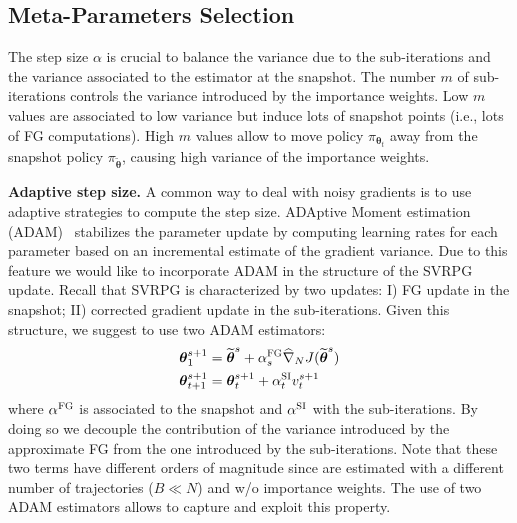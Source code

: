 \documentclass{article}
\makeatletter
\theoremstyle{remark}
\theoremstyle{definition}
\DeclareRobustCommand{\ie}{i.e.,\@\xspace}
\newcommand{\todopir}[1]{\todo[color=blued, inline]{\small #1}}
\newcommand{\vtheta}{\boldsymbol{\theta}}
\newcommand{\wt}[1]{\widetilde{#1}}
\newcommand{\wh}[1]{\widehat{#1}}
\makeatother
\begin{document}
\subsection{Meta-Parameters Selection}\label{sec:stopping}
\todopir{I'm here!}
The step size $\alpha$ is crucial to balance the variance due to the sub-iterations and the variance associated to the estimator at the snapshot.
The number $m$ of sub-iterations controls the variance introduced by the importance weights. Low $m$ values are associated to low variance but induce lots of snapshot points (\ie lots of FG computations). High $m$ values allow to move policy $\pi_{\vtheta_t}$ away from the snapshot policy $\pi_{\wt{\vtheta}}$, causing high variance of the importance weights.

\textbf{Adaptive step size.}
A common way to deal with noisy gradients is to use adaptive strategies to compute the step size.
ADAptive Moment estimation (ADAM)~\citep{kingma2014adam} stabilizes the parameter update by computing learning rates for each parameter based on an incremental estimate of the gradient variance.
Due to this feature we would like to incorporate ADAM in the structure of the SVRPG update.
Recall that SVRPG is characterized by two updates: I) FG update in the snapshot; II) corrected gradient update in the sub-iterations.
Given this structure, we suggest to use two ADAM estimators:
\begin{align*}
        \vtheta^{s+1}_1 &= \wt{\vtheta}^s + \alpha^{\textsc{FG}}_s\wh{\nabla}_N J(\wt{\vtheta}^s)\\
        \vtheta^{s+1}_{t+1} &= \vtheta^{s+1}_t + \alpha^{\textsc{SI}}_t v_t^{s+1}
\end{align*}
where $\alpha^{\textsc{FG}}$ is associated to the snapshot and $\alpha^{\textsc{SI}}$ with the sub-iterations.
By doing so we decouple the contribution of the variance introduced by the approximate FG from the one introduced by the sub-iterations.
Note that these two terms have different orders of magnitude since are estimated with a different number of trajectories ($B \ll N$) and w/o importance weights.
The use of two ADAM estimators allows to capture and exploit this property.
\end{document}

